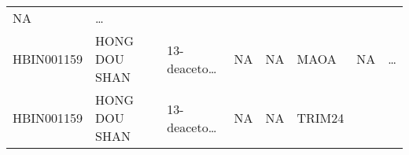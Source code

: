 \documentclass[
]{article}
\begin{document}
\begin{longtable}[]{@{}llllllll@{}}
\begin{minipage}[t]{0.11\columnwidth}
NA\strut
\end{minipage} & \begin{minipage}[t]{0.03\columnwidth}\raggedright
\ldots{}\strut
\end{minipage}\tabularnewline
\begin{minipage}[t]{0.11\columnwidth}\raggedright
HBIN001159\strut
\end{minipage} & \begin{minipage}[t]{0.11\columnwidth}\raggedright
HONG DOU SHAN\strut
\end{minipage} & \begin{minipage}[t]{0.14\columnwidth}\raggedright
13-deaceto\ldots{}\strut
\end{minipage} & \begin{minipage}[t]{0.14\columnwidth}\raggedright
NA\strut
\end{minipage} & \begin{minipage}[t]{0.08\columnwidth}\raggedright
NA\strut
\end{minipage} & \begin{minipage}[t]{0.09\columnwidth}\raggedright
MAOA\strut
\end{minipage} & \begin{minipage}[t]{0.11\columnwidth}\raggedright
NA\strut
\end{minipage} & \begin{minipage}[t]{0.03\columnwidth}\raggedright
\ldots{}\strut
\end{minipage}\tabularnewline
\begin{minipage}[t]{0.11\columnwidth}\raggedright
HBIN001159\strut
\end{minipage} & \begin{minipage}[t]{0.11\columnwidth}\raggedright
HONG DOU SHAN\strut
\end{minipage} & \begin{minipage}[t]{0.14\columnwidth}\raggedright
13-deaceto\ldots{}\strut
\end{minipage} & \begin{minipage}[t]{0.14\columnwidth}\raggedright
NA\strut
\end{minipage} & \begin{minipage}[t]{0.08\columnwidth}\raggedright
NA\strut
\end{minipage} & \begin{minipage}[t]{0.09\columnwidth}\raggedright
TRIM24\strut
\end{minipage} & \begin{minipage}[t]{0.11\columnwidth}\raggedright

\end{minipage}
\end{longtable}
\end{document}
